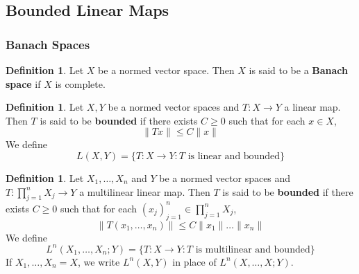 \documentclass[notheorems]{beamer}
\theoremstyle{definition}
\newtheorem{defn}[definition]{Definition}
\theoremstyle{definition}
\begin{document}
\subsection{Bounded Linear Maps}
\begin{frame}
\frametitle{Banach Spaces}
	
	\begin{defn}
		Let $X$ be a normed vector space. Then $X$ is said to be a \textbf{Banach space} if $X$ is complete.  
	\end{defn}
	
	\pause
	
	\begin{defn}
		Let $X,Y$ be a normed vector spaces and $T:X \rightarrow Y$ a linear map. Then $T$ is said to be \textbf{bounded} if there exists $C \geq 0$ such that for each $x \in X$, $$\|Tx \|\leq C \|x \|$$ We define $$L(X,Y) = \{T:X \rightarrow Y: T \text{ is linear and bounded}\}$$
	\end{defn}
	\end{frame}
	
	
	
	
	
	
	
	
	
	
	
	
	
	
	
	
	\begin{frame}
	
	\begin{defn}
		Let $X_1, \dots, X_n$ and $Y$ be a normed vector spaces and $T:\prod\limits_{j=1}^n X_j \rightarrow Y$ a multilinear linear map. Then $T$ is said to be \textbf{bounded} if there exists $C \geq 0$ such that for each $(x_j)_{j=1}^n \in \prod\limits_{j=1}^n X_j$, $$\|T(x_1, \dots, x_n) \|\leq C \|x_1 \| \dots \|x_n\|$$ 
		We define $$L^n(X_1, \dots, X_n; Y) = \{T:X \rightarrow Y: T \text{ is multilinear and bounded}\}$$ 
		If $X_1, \dots, X_n = X$, we write $L^n(X,Y)$ in place of  $L^n(X, \dots, X; Y)$.
	\end{defn}
	
	\end{frame}
	
	
	
	
	
	

	
	
	
	
	
	
	
	
	
	
\end{document}
